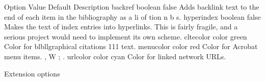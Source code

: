 
Option Value Default Description 
backref boolean false Adds backlink text to the end of each item in the bibliography as a 
li of tion n b s. 
hyperindex boolean false Makes the text of index entries into hyperlinks. This is fairly fragile, 
and a serious project would need to implement its own scheme. 
cltecolor color green Color for blbllgraphical citations 111 text. 
menucolor color red Color for Acrobat menu items. 
,  W ; . 
urlcolor color cyan Color for linked network URLs. 

Extension options 
